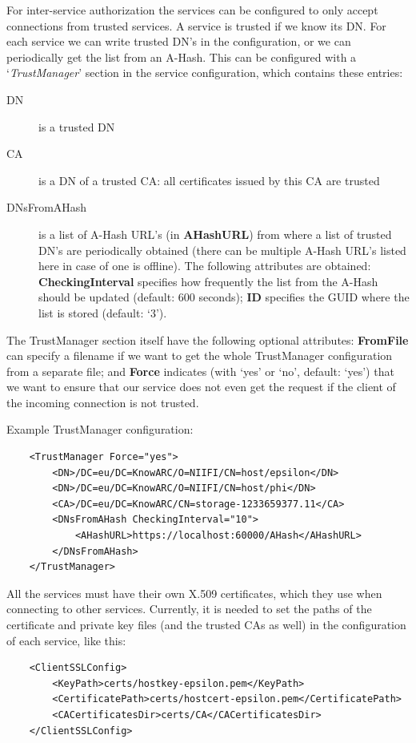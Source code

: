\documentclass{book}
\begin{document}
For inter-service authorization the services can be configured to only accept connections from trusted services. A service is trusted if we know its DN. For each service we can write trusted DN's in the configuration, or we can periodically get the list from an A-Hash. This can be configured with a `\emph{TrustManager}' section in the service configuration, which contains these entries:

\begin{description}
    \item[DN] is a trusted DN
    \item[CA] is a DN of a trusted CA: all certificates issued by this CA are trusted
    \item[DNsFromAHash] is a list of A-Hash URL's (in \textbf{AHashURL}) from where a list of trusted DN's are periodically obtained (there can be multiple A-Hash URL's listed here in case of one is offline). The following attributes are obtained: \textbf{CheckingInterval} specifies how frequently the list from the A-Hash should be updated (default: 600 seconds); \textbf{ID} specifies the GUID where the list is stored (default: `3').
\end{description}

The TrustManager section itself have the following optional attributes: \textbf{FromFile} can specify a filename if we want to get the whole TrustManager configuration from a separate file; and \textbf{Force} indicates (with `yes' or `no', default: `yes') that we want to ensure that our service does not even get the request if the client of the incoming connection is not trusted. 

Example TrustManager configuration:

\begin{verbatim}
    <TrustManager Force="yes">
        <DN>/DC=eu/DC=KnowARC/O=NIIFI/CN=host/epsilon</DN>
        <DN>/DC=eu/DC=KnowARC/O=NIIFI/CN=host/phi</DN>
        <CA>/DC=eu/DC=KnowARC/CN=storage-1233659377.11</CA>
        <DNsFromAHash CheckingInterval="10">
            <AHashURL>https://localhost:60000/AHash</AHashURL>
        </DNsFromAHash>
    </TrustManager>
\end{verbatim}

All the services must have their own X.509 certificates, which they use when connecting to other services. Currently, it is needed to set the paths of the certificate and private key files (and the trusted CAs as well) in the configuration of each service, like this:

\begin{verbatim}
    <ClientSSLConfig>
        <KeyPath>certs/hostkey-epsilon.pem</KeyPath>
        <CertificatePath>certs/hostcert-epsilon.pem</CertificatePath>
        <CACertificatesDir>certs/CA</CACertificatesDir>
    </ClientSSLConfig>
\end{verbatim}
\end{document}
